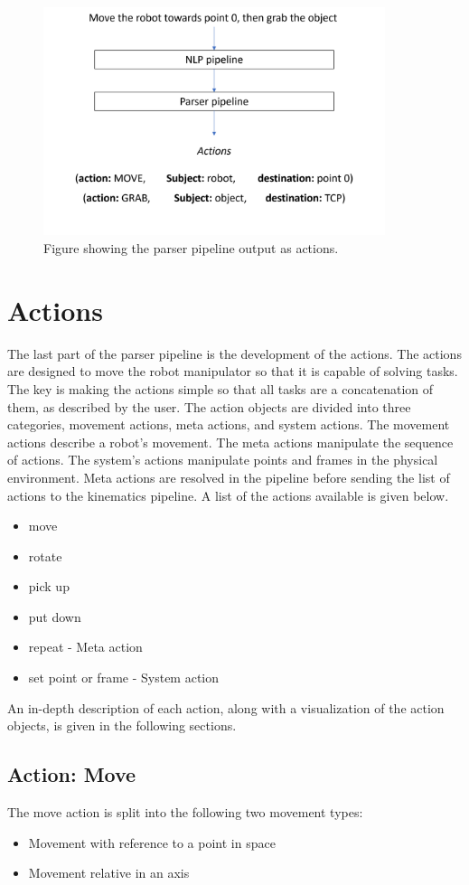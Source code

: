 \begin{figure}[ht]
    \centering
    \includegraphics[width=10cm]{img/dep_parser_to_actions.png}
    \caption{Figure showing the parser pipeline output as actions.}
    \label{fig:dep_pars_actions}
\end{figure}



\section{Actions}
The last part of the parser pipeline is the development of the actions. The actions are designed to move the robot manipulator so that it is capable of solving tasks. The key is making the actions simple so that all tasks are a concatenation of them, as described by the user.
The action objects are divided into three categories, movement actions, meta actions, and system actions. The movement actions describe a robot's movement. The meta actions manipulate the sequence of actions. The system's actions manipulate points and frames in the physical environment. Meta actions are resolved in the pipeline before sending the list of actions to the kinematics pipeline. A list of the actions available is given below.
\begin{itemize}
    \item move
    \item rotate
    \item pick up
    \item put down
    \item repeat - Meta action
    \item set point or frame - System action
\end{itemize}
An in-depth description of each action, along with a visualization of the action objects, is given in the following sections.


\subsection{Action: Move} \label{esc:SA_MOVE}
The move action is split into the following two movement types:
\begin{itemize}
    \item Movement with reference to a point in space
    \item Movement relative in an axis
\end{itemize}

